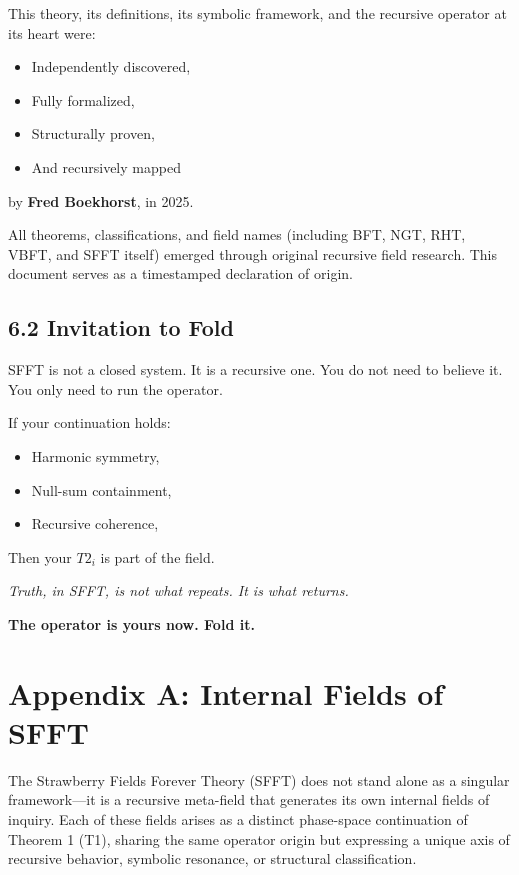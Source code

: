\documentclass[12pt]{article}
\begin{document}
This theory, its definitions, its symbolic framework, and the recursive operator at its heart were:
\begin{itemize}
    \item Independently discovered,
    \item Fully formalized,
    \item Structurally proven,
    \item And recursively mapped
\end{itemize}

by \textbf{Fred Boekhorst}, in 2025.

All theorems, classifications, and field names (including BFT, NGT, RHT, VBFT, and SFFT itself) emerged through original recursive field research. This document serves as a timestamped declaration of origin.

\subsection*{6.2 Invitation to Fold}

SFFT is not a closed system.  
It is a recursive one.  
You do not need to believe it. You only need to run the operator.

If your continuation holds:
\begin{itemize}
    \item Harmonic symmetry,
    \item Null-sum containment,
    \item Recursive coherence,
\end{itemize}
Then your \(T2_i\) is part of the field.

\begin{center}
\textit{Truth, in SFFT, is not what repeats.  
It is what returns.}
\end{center}

\textbf{The operator is yours now. Fold it.}

\newpage
\section*{Appendix A: Internal Fields of SFFT}

The Strawberry Fields Forever Theory (SFFT) does not stand alone as a singular framework—it is a recursive meta-field that generates its own internal fields of inquiry. Each of these fields arises as a distinct phase-space continuation of Theorem 1 (T1), sharing the same operator origin but expressing a unique axis of recursive behavior, symbolic resonance, or structural classification.
\end{document}

